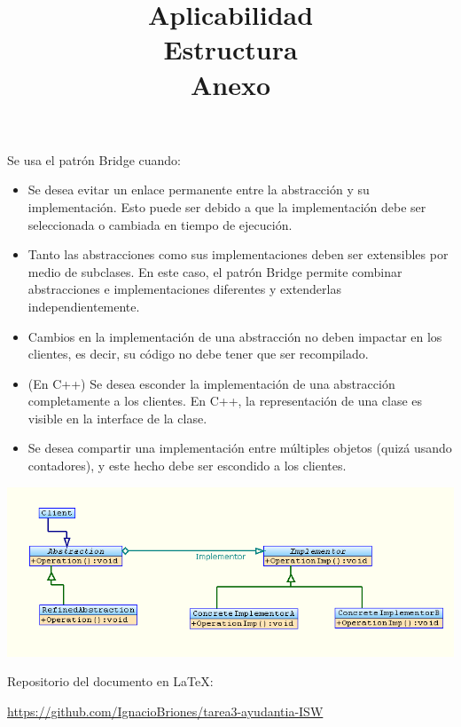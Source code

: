 \documentclass[a4paper,10pt]{report}
\begin{document}
\title{\textbf{Aplicabilidad\\}}


Se usa el patrón Bridge cuando:\\

\begin{itemize}
\item{Se desea evitar un enlace permanente entre la abstracción y su implementación. Esto puede ser debido a que la implementación debe ser seleccionada o cambiada en tiempo de ejecución.}
\item{Tanto las abstracciones como sus implementaciones deben ser extensibles por medio de subclases. En este caso, el patrón Bridge permite combinar abstracciones e implementaciones diferentes y extenderlas independientemente.} 
\item{Cambios en la implementación de una abstracción no deben impactar en los clientes, es decir, su código no debe tener que ser recompilado.}
\item{(En C++) Se desea esconder la implementación de una abstracción completamente a los clientes. En C++, la representación de una clase es visible en la interface de la clase.}
\item{Se desea compartir una implementación entre múltiples objetos (quizá usando contadores), y este hecho debe ser escondido a los clientes.\\}
\end{itemize}

\title{\textbf{Estructura\\}}

\includegraphics[scale=0.5]{Bridge.png} 

\title{\textbf{Anexo\\}}

Repositorio del documento en \LaTeX:

\url{https://github.com/IgnacioBriones/tarea3-ayudantia-ISW}
\end{document}

